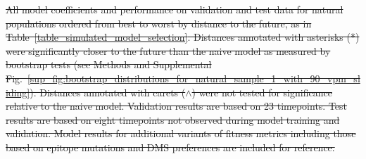 \documentclass[9pt,lineno]{elife} %
\providecommand{\DIFdel}[1]{{\protect\color{red}\sout{#1}}}                      %
\providecommand{\DIFdelFL}[1]{\DIFdel{#1}} %
\providecommand{\DIFdeltex}[1]{{\protect\color{red}\sout{#1}}}                      %
\providecommand{\DIFdelFL}[1]{\DIFdel{#1}} %
\providecommand{\DIFdel}[1]{\texorpdfstring{\DIFdeltex{#1}}{}} %
\begin{document}


{%
\DIFdelFL{All model coefficients and performance on validation and test data for natural populations ordered from best to worst by distance to the future, as in Table~\ref{table_simulated_model_selection}.
      Distances annotated with asterisks (*) were significantly closer to the future than the naive model as measured by bootstrap tests (see Methods and Supplemental Fig.~\ref{sup_fig:bootstrap_distributions_for_natural_sample_1_with_90_vpm_sliding}).
      Distances annotated with carets ($\wedge$) were not tested for significance relative to the naive model.
      Validation results are based on 23 timepoints.
      Test results are based on eight timepoints not observed during model training and validation.
      Model results for additional variants of fitness metrics including those based on epitope mutations and DMS preferences are included for reference.
    }}
\end{document}
